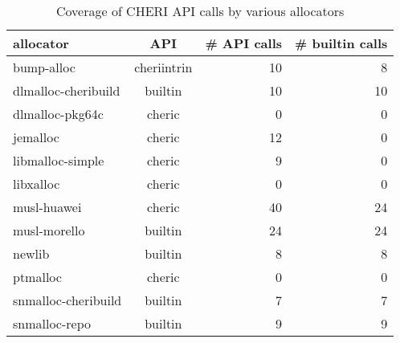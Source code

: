 \begin{table}[t]
\begin{center}
\begin{tabular}{lcrr}
\toprule
allocator & API & \# API calls & \# builtin calls \\
\midrule
bump-alloc & cheriintrin & 10 & 8\\
dlmalloc-cheribuild & builtin & 10 & 10\\
dlmalloc-pkg64c & cheric & 0 & 0\\
jemalloc & cheric & 12 & 0\\
libmalloc-simple & cheric & 9 & 0\\
libxalloc & cheric & 0 & 0\\
musl-huawei & cheric & 40 & 24\\
musl-morello & builtin & 24 & 24\\
newlib & builtin & 8 & 8\\
ptmalloc & cheric & 0 & 0\\
snmalloc-cheribuild & builtin & 7 & 7\\
snmalloc-repo & builtin & 9 & 9
\\ \bottomrule
\end{tabular}
\caption{\label{tab:rq1}Coverage of CHERI API calls by various allocators}
\label{tab:atks}
\end{center}
\end{table}